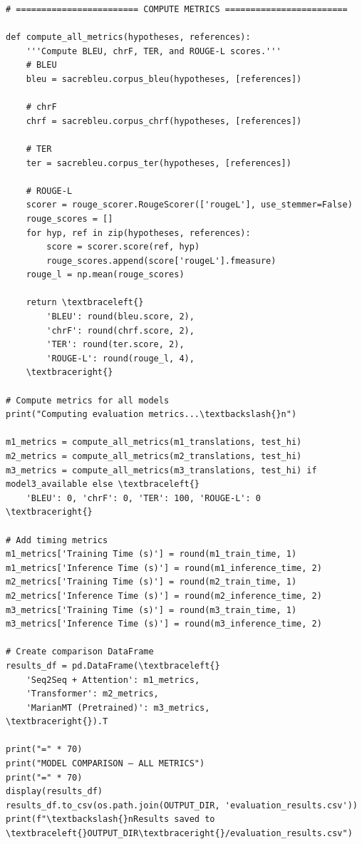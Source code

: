 \documentclass[12pt,a4paper,oneside]{report}
\begin{document}
\begin{Verbatim}[commandchars=\\\{\},breaklines=true,breakanywhere=true,fontsize=\scriptsize,frame=leftline,framesep=2mm,rulecolor=\color{gray}]
# ======================== COMPUTE METRICS ========================

def compute_all_metrics(hypotheses, references):
    '''Compute BLEU, chrF, TER, and ROUGE-L scores.'''
    # BLEU
    bleu = sacrebleu.corpus_bleu(hypotheses, [references])

    # chrF
    chrf = sacrebleu.corpus_chrf(hypotheses, [references])

    # TER
    ter = sacrebleu.corpus_ter(hypotheses, [references])

    # ROUGE-L
    scorer = rouge_scorer.RougeScorer(['rougeL'], use_stemmer=False)
    rouge_scores = []
    for hyp, ref in zip(hypotheses, references):
        score = scorer.score(ref, hyp)
        rouge_scores.append(score['rougeL'].fmeasure)
    rouge_l = np.mean(rouge_scores)

    return \textbraceleft{}
        'BLEU': round(bleu.score, 2),
        'chrF': round(chrf.score, 2),
        'TER': round(ter.score, 2),
        'ROUGE-L': round(rouge_l, 4),
    \textbraceright{}

# Compute metrics for all models
print("Computing evaluation metrics...\textbackslash{}n")

m1_metrics = compute_all_metrics(m1_translations, test_hi)
m2_metrics = compute_all_metrics(m2_translations, test_hi)
m3_metrics = compute_all_metrics(m3_translations, test_hi) if model3_available else \textbraceleft{}
    'BLEU': 0, 'chrF': 0, 'TER': 100, 'ROUGE-L': 0
\textbraceright{}

# Add timing metrics
m1_metrics['Training Time (s)'] = round(m1_train_time, 1)
m1_metrics['Inference Time (s)'] = round(m1_inference_time, 2)
m2_metrics['Training Time (s)'] = round(m2_train_time, 1)
m2_metrics['Inference Time (s)'] = round(m2_inference_time, 2)
m3_metrics['Training Time (s)'] = round(m3_train_time, 1)
m3_metrics['Inference Time (s)'] = round(m3_inference_time, 2)

# Create comparison DataFrame
results_df = pd.DataFrame(\textbraceleft{}
    'Seq2Seq + Attention': m1_metrics,
    'Transformer': m2_metrics,
    'MarianMT (Pretrained)': m3_metrics,
\textbraceright{}).T

print("=" * 70)
print("MODEL COMPARISON — ALL METRICS")
print("=" * 70)
display(results_df)
results_df.to_csv(os.path.join(OUTPUT_DIR, 'evaluation_results.csv'))
print(f"\textbackslash{}nResults saved to \textbraceleft{}OUTPUT_DIR\textbraceright{}/evaluation_results.csv")
\end{Verbatim}
\end{document}
